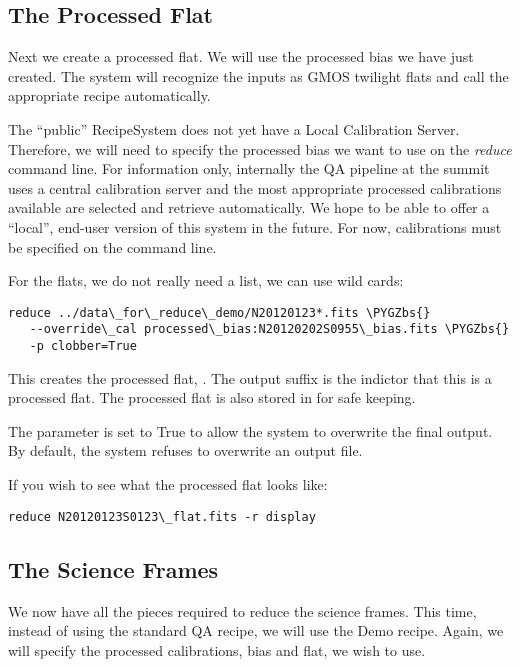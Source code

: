 \documentclass[letterpaper,10pt,english]{sphinxmanual}
\def\PYGZbs{\char`\\}
\begin{document}
\subsection{The Processed Flat}
\label{appendices/appendix_demo:the-processed-flat}
Next we create a processed flat.  We will use the processed bias we have
just created.  The system will recognize the inputs as GMOS twilight flats and
call the appropriate recipe automatically.

The ``public'' RecipeSystem does not yet have a Local Calibration Server.  Therefore,
we will need to specify the processed bias we want to use on the \emph{reduce} command
line.  For information only, internally the QA pipeline at the summit uses a
central calibration server and the most appropriate processed calibrations available
are selected and retrieve automatically.  We hope to be able to offer a ``local'',
end-user version of this system in the future.  For now, calibrations must be
specified on the command line.

For the flats, we do not really need a list, we can use wild cards:

\begin{Verbatim}[commandchars=\\\{\}]
reduce ../data\_for\_reduce\_demo/N20120123*.fits \PYGZbs{}
   --override\_cal processed\_bias:N20120202S0955\_bias.fits \PYGZbs{}
   -p clobber=True
\end{Verbatim}

This creates the processed flat, .  The output suffix
 is the indictor that this is a processed flat.  The processed flat is also
stored in  for safe keeping.

The  parameter is set to True to allow the system to overwrite the final
output.  By default, the system refuses to overwrite an output file.

If you wish to see what the processed flat looks like:

\begin{Verbatim}[commandchars=\\\{\}]
reduce N20120123S0123\_flat.fits -r display
\end{Verbatim}


\subsection{The Science Frames}
\label{appendices/appendix_demo:the-science-frames}
We now have all the pieces required to reduce the science frames.  This time,
instead of using the standard QA recipe, we will use the Demo recipe.  Again,
we will specify the processed calibrations, bias and flat, we wish to use.
\end{document}
